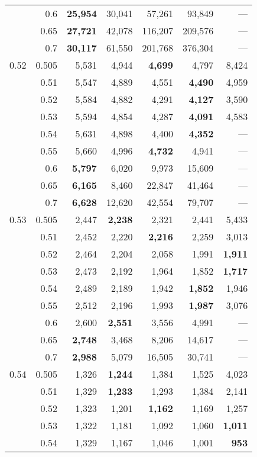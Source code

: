 \documentclass[aoas]{imsart}
\begin{document}
\begin{table}
\begin{tabular}{lr|rrrr|r}
     & 0.6 & \bf{25,954} & 30,041 & 57,261 & 93,849 & --- \\
     & 0.65 & \bf{27,721} & 42,078 & 116,207 & 209,576 & --- \\
     & 0.7 & \bf{30,117} & 61,550 & 201,768 & 376,304 & --- \\
\hline
0.52 & 0.505 & 5,531 & 4,944 & \bf{4,699} & 4,797 & 8,424 \\
     & 0.51 & 5,547 & 4,889 & 4,551 & \bf{4,490} & 4,959 \\
     & 0.52 & 5,584 & 4,882 & 4,291 & \bf{4,127} & 3,590 \\
     & 0.53 & 5,594 & 4,854 & 4,287 & \bf{4,091} & 4,583 \\
     & 0.54 & 5,631 & 4,898 & 4,400 & \bf{4,352} & --- \\
     & 0.55 & 5,660 & 4,996 & \bf{4,732} & 4,941 & --- \\
     & 0.6 & \bf{5,797} & 6,020 & 9,973 & 15,609 & --- \\
     & 0.65 & \bf{6,165} & 8,460 & 22,847 & 41,464 & --- \\
     & 0.7 & \bf{6,628} & 12,620 & 42,554 & 79,707 & --- \\
\hline
0.53 & 0.505 & 2,447 & \bf{2,238} & 2,321 & 2,441 & 5,433 \\
     & 0.51 & 2,452 & 2,220 & \bf{2,216} & 2,259 & 3,013 \\
     & 0.52 & 2,464 & 2,204 & 2,058 & 1,991 & \bf{1,911} \\
     & 0.53 & 2,473 & 2,192 & 1,964 & 1,852 & \bf{1,717} \\
     & 0.54 & 2,489 & 2,189 & 1,942 & \bf{1,852} & 1,946 \\
     & 0.55 & 2,512 & 2,196 & 1,993 & \bf{1,987} & 3,076 \\
     & 0.6 & 2,600 & \bf{2,551} & 3,556 & 4,991 & --- \\
     & 0.65 & \bf{2,748} & 3,468 & 8,206 & 14,617 & --- \\
     & 0.7 & \bf{2,988} & 5,079 & 16,505 & 30,741 & --- \\
\hline
0.54 & 0.505 & 1,326 & \bf{1,244} & 1,384 & 1,525 & 4,023 \\
     & 0.51 & 1,329 & \bf{1,233} & 1,293 & 1,384 & 2,141 \\
     & 0.52 & 1,323 & 1,201 & \bf{1,162} & 1,169 & 1,257 \\
     & 0.53 & 1,322 & 1,181 & 1,092 & 1,060 & \bf{1,011} \\
     & 0.54 & 1,329 & 1,167 & 1,046 & 1,001 & \bf{953} \\

\end{tabular}
\end{table}
\end{document}
